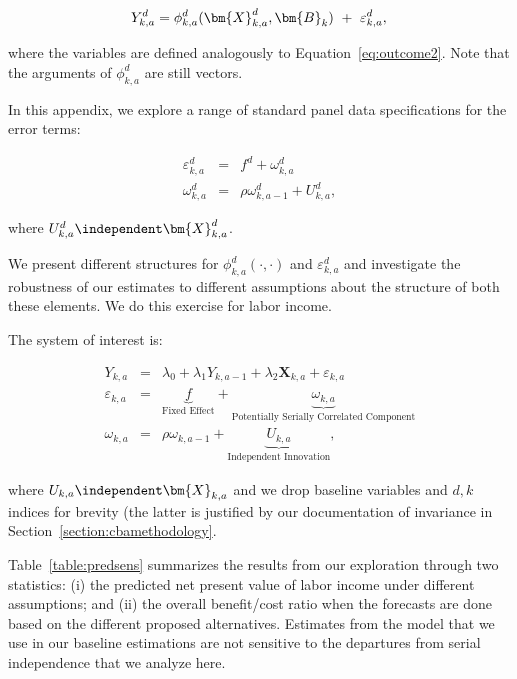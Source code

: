 \begin{equation}
Y^d_{k,a} =\phi^d_{k,a} (\bm{X}^d_{k,a}, \bm{B}_k) \ + \ \varepsilon^d_{k,a},  \label{eq:outcomesin} \\
\end{equation}

\noindent where the variables are defined analogously to Equation~\eqref{eq:outcome2}. Note that the arguments of $\phi^d_{k,a}$ are still vectors.

In this appendix, we explore a range of standard panel data specifications for the error terms:

\begin{eqnarray}
\varepsilon^d_{k,a} &=& f^d + \omega^d_{k,a} \nonumber \\
\omega^d_{k,a}      &=& \rho \omega^d_{k,a-1} + U^d_{k,a},
\end{eqnarray}

\noindent where $U^d_{k,a} \independent \bm{X}^d_{k,a}$.

\noindent We present different structures for $\phi_{k,a}^d \left( \cdot, \cdot \right)$ and $\varepsilon_{k,a}^d$ and investigate the robustness of our estimates to different assumptions about the structure of both these elements. We do this exercise for labor income.

The system of interest is:

\begin{eqnarray}
Y_{k,a}                   &=& \lambda_{0} + \lambda_{1} Y_{k,a-1} + \lambda_{2}  \bm{X}_{k,a} + \varepsilon_{k,a} \nonumber \\
\varepsilon_{k,a} &=& \underbrace{f}_{\text{Fixed Effect}} + \underbrace{\omega_{k,a}}_{\text{Potentially Serially Correlated Component}} \nonumber \\
\omega_{k,a}      &=& \rho \omega_{k,a-1} + \underbrace{U_{k,a}}_{\text{Independent Innovation}},
\end{eqnarray}

\noindent where $U_{k,a} \independent \bm{X}_{k,a}$ and we drop baseline variables and $d,k$ indices for brevity (the latter is justified by our documentation of invariance in Section~\ref{section:cbamethodology}.

Table~\ref{table:predsens} summarizes the results from our exploration through two statistics: (i) the predicted net present value of labor income under different assumptions; and (ii) the overall benefit/cost ratio when the forecasts are done based on the different proposed alternatives. Estimates from the model that we use in our baseline estimations are not sensitive to the departures from serial independence that we analyze here.

